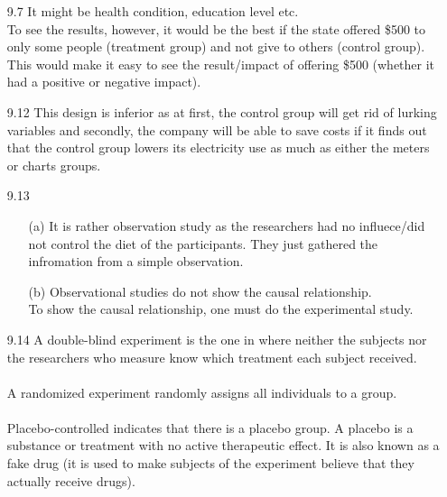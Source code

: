 \documentclass[11pt, a4paper]{article}
\begin{document}
\begin{itemize}
\item[]
\item[]

\item[9.7]
It might be health condition, education level etc.
\\
To see the results, however, it would be the best if the state
offered \$500 to only some people (treatment group) and not
give to others (control group). This would make it easy to
see the result/impact of offering \$500 (whether it had a positive
or negative impact).

\item[]
\item[]

\item[9.12]
This design is inferior as at first, the control group will get rid of lurking variables and secondly,
the company will be able to save costs if it finds out that the control group lowers its electricity use
as much as either the meters or charts groups.

\newpage

\item[9.13]
\begin{itemize}
\item[(a)]
It is rather observation study as the researchers had no influece/did not control the diet of the participants.
They just gathered the infromation from a simple observation.

\item[]

\item[(b)]
Observational studies do not show the causal relationship.\\
To show the causal relationship, one must do the experimental study.
\end{itemize}

\item[]
\item[]

\item[9.14]
A double-blind experiment is the one in where neither the subjects nor the researchers who measure know which treatment each subject received.\\\\
A randomized experiment randomly assigns all individuals to a group.\\\\
Placebo-controlled indicates that there is a placebo group. A placebo is a substance or treatment with no active therapeutic effect.
It is also known as a fake drug (it is used to make subjects of the experiment believe that they actually receive drugs).


\end{itemize}
\end{document}
